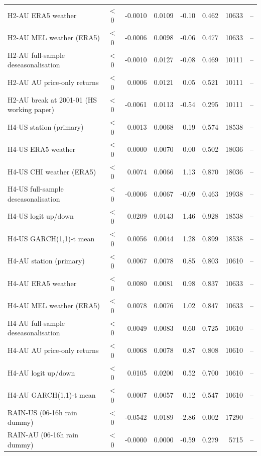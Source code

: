 \begin{table}[htbp]
\begin{tabular}{lcrrrrrc}
H2-AU ERA5 weather & $<$0 & -0.0010 & 0.0109 & -0.10 & 0.462 & 10633 & -- \\
H2-AU MEL weather (ERA5) & $<$0 & -0.0006 & 0.0098 & -0.06 & 0.477 & 10633 & -- \\
H2-AU full-sample deseasonalisation & $<$0 & -0.0010 & 0.0127 & -0.08 & 0.469 & 10111 & -- \\
H2-AU AU price-only returns & $<$0 & 0.0006 & 0.0121 & 0.05 & 0.521 & 10111 & -- \\
H2-AU break at 2001-01 (HS working paper) & $<$0 & -0.0061 & 0.0113 & -0.54 & 0.295 & 10111 & -- \\
H4-US station (primary) & $<$0 & 0.0013 & 0.0068 & 0.19 & 0.574 & 18538 & -- \\
H4-US ERA5 weather & $<$0 & 0.0000 & 0.0070 & 0.00 & 0.502 & 18036 & -- \\
H4-US CHI weather (ERA5) & $<$0 & 0.0074 & 0.0066 & 1.13 & 0.870 & 18036 & -- \\
H4-US full-sample deseasonalisation & $<$0 & -0.0006 & 0.0067 & -0.09 & 0.463 & 19938 & -- \\
H4-US logit up/down & $<$0 & 0.0209 & 0.0143 & 1.46 & 0.928 & 18538 & -- \\
H4-US GARCH(1,1)-t mean & $<$0 & 0.0056 & 0.0044 & 1.28 & 0.899 & 18538 & -- \\
H4-AU station (primary) & $<$0 & 0.0067 & 0.0078 & 0.85 & 0.803 & 10610 & -- \\
H4-AU ERA5 weather & $<$0 & 0.0080 & 0.0081 & 0.98 & 0.837 & 10633 & -- \\
H4-AU MEL weather (ERA5) & $<$0 & 0.0078 & 0.0076 & 1.02 & 0.847 & 10633 & -- \\
H4-AU full-sample deseasonalisation & $<$0 & 0.0049 & 0.0083 & 0.60 & 0.725 & 10610 & -- \\
H4-AU AU price-only returns & $<$0 & 0.0068 & 0.0078 & 0.87 & 0.808 & 10610 & -- \\
H4-AU logit up/down & $<$0 & 0.0105 & 0.0200 & 0.52 & 0.700 & 10610 & -- \\
H4-AU GARCH(1,1)-t mean & $<$0 & 0.0007 & 0.0057 & 0.12 & 0.547 & 10610 & -- \\
RAIN-US (06-16h rain dummy) & $<$0 & -0.0542 & 0.0189 & -2.86 & 0.002 & 17290 & -- \\
RAIN-AU (06-16h rain dummy) & $<$0 & -0.0000 & 0.0000 & -0.59 & 0.279 & 5715 & -- \\
\bottomrule\end{tabular}\end{table}
